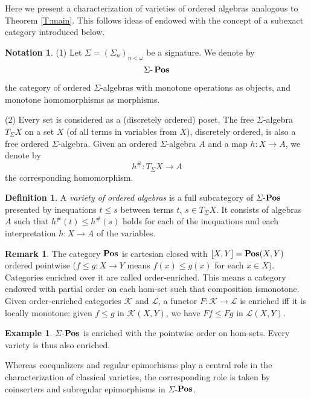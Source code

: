 \documentclass[12pt,amstex,leqno]{amsart}
\newcommand\Pos{\operatorname{\bf Pos}}
\newcommand\ck{\mathcal {K}}
\newcommand\cl{\mathcal {L}}
\theoremstyle{definition}
\newtheorem{defi}[theorem]{Definition}
\newtheorem{example}[theorem]{Example}
\newtheorem{remark}[theorem]{Remark}
\newtheorem{nota}[theorem]{Notation}
\numberwithin{equation}{section}
\begin{document}
Here we present a characterization of varieties of ordered algebras analogous to Theorem \ref{T:main}. This follows ideas of \cite{ARO} endowed with the concept of a subexact category introduced below.

\begin{nota} \label{N:free}
(1) Let $\Sigma = (\Sigma_n)_{n<\omega}$ be a signature. We denote by
$$
\Sigma \mbox{-} \Pos
$$
the category of ordered $\Sigma$-algebras with monotone operations as objects, and monotone homomorphisms as morphisms.

(2) Every set is considered as a (discretely ordered) poset. The free $\Sigma$-algebra $T_{\Sigma} X$ on a set $X$ (of all terms in variables from $X$), discretely ordered, is also a free ordered $\Sigma$-algebra. Given an ordered $\Sigma$-algebra $A$ and a map $h\colon X \to A$, we denote by
$$
h^\# \colon T_\Sigma X\to A
$$
the corresponding homomorphism.
\end{nota}

\begin{defi}
 A \emph{variety of ordered algebras} is a full subcategory of $\Sigma$-$\Pos$ presented by inequations $t\leq s$ between terms $t$, $s\in T_{\Sigma} X$. It consists of algebras $A$ such that $h^\#(t) \leq h^\# (s)$ holds for each of the inequations and each interpretation $h\colon X\to A$ of the variables.
\end{defi}

\begin{remark}
The category $\Pos$ is cartesian closed with $[X,Y] =\Pos(X,Y)$ ordered pointwise ($f\leq g\colon X\to Y$ means $f(x) \leq g(x)$ for each $x\in X$). Categories enriched over it are called  order-enriched. This means a category endowed with partial order on each hom-set such that composition ismonotone. Given order-enriched categories $\ck$ and $\cl$, a functor $F\colon \ck \to \cl$ is enriched iff it is locally monotone: given $f\leq g$ in $\ck(X,Y)$, we have $Ff\leq Fg$ in $\cl(X,Y)$.
\end{remark}

\begin{example}%
$\Sigma$-$\Pos$ is enriched with the pointwise order on hom-sets. Every variety is thus also enriched.
\end{example}

Whereas coequalizers and regular epimorhisms  play a central role in the characterization of  classical varieties, the corresponding role is taken by coinserters and subregular epimorphisms in $\Sigma$-$\Pos$.
\end{document}
